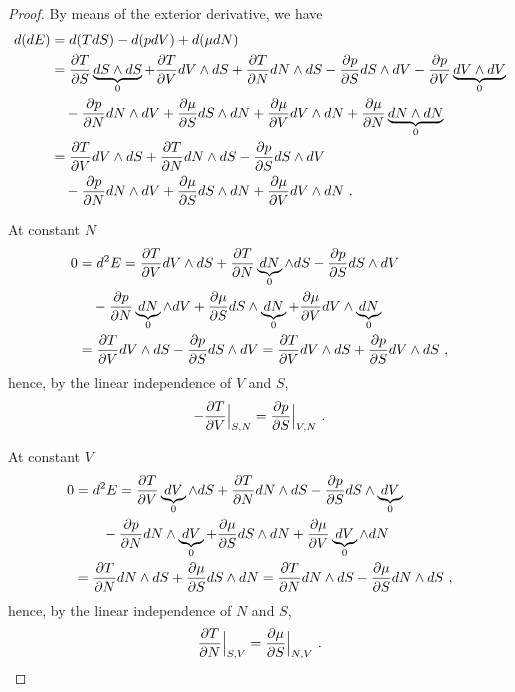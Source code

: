     \begin{proof}
        By means of the exterior derivative, we have 
        \begin{equation*}
        \begin{aligned}
            d (dE) & = d (T dS) - d (p dV) + d (\mu dN) \\ & = \frac{\partial T}{\partial S} \underbrace{dS \wedge dS}_0 + \frac{\partial T}{\partial V} dV \wedge dS + \frac{\partial T}{\partial N} dN \wedge dS - \frac{\partial p}{\partial S} dS \wedge dV - \frac{\partial p}{\partial V} \underbrace{dV \wedge dV}_0 \\ & \quad - \frac{\partial p}{\partial N} dN \wedge dV + \frac{\partial\mu}{\partial S} dS \wedge dN + \frac{\partial\mu}{\partial V} dV \wedge dN + \frac{\partial\mu}{\partial N} \underbrace{dN \wedge dN}_0 \\ & = \frac{\partial T}{\partial V} dV \wedge dS + \frac{\partial T}{\partial N} dN \wedge dS - \frac{\partial p}{\partial S} dS \wedge dV \\ & \quad - \frac{\partial p}{\partial N} dN \wedge dV + \frac{\partial\mu}{\partial S} dS \wedge dN + \frac{\partial\mu}{\partial V} dV \wedge dN ~.
        \end{aligned}
        \end{equation*}

        At constant $N$ 
        \begin{equation*}
        \begin{aligned}
            0 & = d^2 E = \frac{\partial T}{\partial V} dV \wedge dS + \frac{\partial T}{\partial N} \underbrace{dN}_0 \wedge dS - \frac{\partial p}{\partial S} dS \wedge dV \\ & \quad - \frac{\partial p}{\partial N} \underbrace{dN}_0 \wedge dV + \frac{\partial\mu}{\partial S} dS \wedge \underbrace{dN}_0 + \frac{\partial\mu}{\partial V} dV \wedge \underbrace{dN}_0 \\ & = \frac{\partial T}{\partial V} dV \wedge dS - \frac{\partial p}{\partial S} dS \wedge dV = \frac{\partial T}{\partial V} dV \wedge dS + \frac{\partial p}{\partial S} dV \wedge dS ~,
        \end{aligned}
        \end{equation*}
        hence, by the linear independence of $V$ and $S$,
        \begin{equation*}
            - \frac{\partial T}{\partial V} \Big \vert_{S,N} = \frac{\partial p}{\partial S} \Big \vert_{V,N} ~.
        \end{equation*}

        At constant $V$ 
        \begin{equation*}
        \begin{aligned}
            0 & = d^2 E = \frac{\partial T}{\partial V} \underbrace{dV}_0 \wedge dS + \frac{\partial T}{\partial N} dN \wedge dS - \frac{\partial p}{\partial S} dS \wedge \underbrace{dV}_0 \\ & \qquad - \frac{\partial p}{\partial N} dN \wedge \underbrace{dV}_0 + \frac{\partial\mu}{\partial S} dS \wedge dN + \frac{\partial\mu}{\partial V} \underbrace{dV}_0 \wedge dN \\ & = \frac{\partial T}{\partial N} dN \wedge dS + \frac{\partial\mu}{\partial S} dS \wedge dN = \frac{\partial T}{\partial N} dN \wedge dS - \frac{\partial\mu}{\partial S} dN \wedge dS~,
        \end{aligned}
        \end{equation*}
        hence, by the linear independence of $N$ and $S$,
        \begin{equation*}
            \frac{\partial T}{\partial N} \Big \vert_{S,V} = \frac{\partial\mu}{\partial S} \Big \vert_{N, V} ~.
        \end{equation*}


\end{proof}
